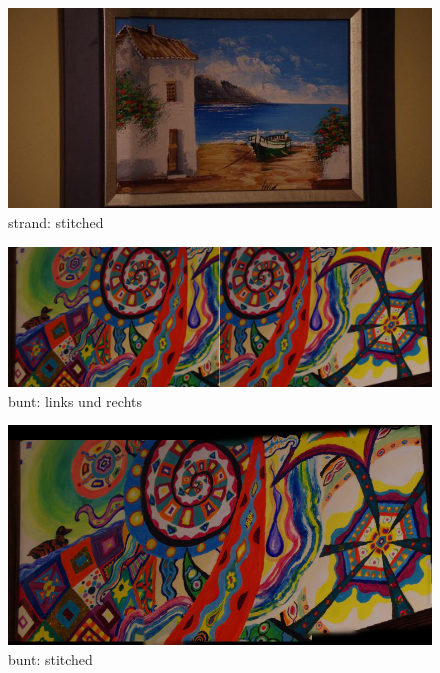 \documentclass[deutsch]{scrartcl}
\begin{document}
\begin{figure}[p]
\begin{center}
\includegraphics[width=1.0\textwidth]{strandS.png}
\caption{strand: stitched}
\label{fig:strandS}
\end{center}
\end{figure}

\begin{figure}[p]
\begin{center}
\includegraphics[width=1.0\textwidth]{bunt.jpg}
\caption{bunt: links und rechts}
\label{fig:bunt}
\end{center}
\end{figure}

\begin{figure}[p]
\begin{center}
\includegraphics[width=1.0\textwidth]{buntS.png}
\caption{bunt: stitched}
\label{fig:buntS}
\end{center}
\end{figure}
\end{document}
